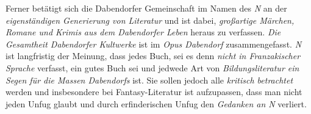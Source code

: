 Ferner betätigt sich die Dabendorfer Gemeinschaft im Namen des \textit{N} an der \textit{eigenständigen Generierung von Literatur} und ist dabei, \textit{großartige Märchen, Romane und Krimis aus dem Dabendorfer Leben} heraus zu verfassen. \textit{Die Gesamtheit Dabendorfer Kultwerke} ist im \textit{Opus Dabendorf} zusammengefasst. \textit{N} ist langfristig der Meinung, dass jedes Buch, sei es denn \textit{nicht in Franzakischer Sprache} verfasst, ein gutes Buch sei und jedwede Art von \textit{Bildungsliteratur ein Segen für die Massen Dabendorfs} ist. Sie sollen jedoch alle \textit{kritisch betrachtet} werden und insbesondere bei Fantasy-Literatur ist aufzupassen, dass man nicht jeden Unfug glaubt und durch erfinderischen Unfug den \textit{Gedanken an N} verliert.